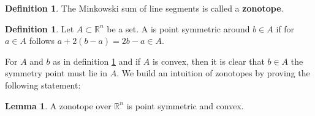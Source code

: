 \documentclass{article}
\theoremstyle{definition}
\newtheorem{lemma}[theorem]{Lemma}
\newtheorem{definition}[theorem]{Definition}
\begin{document}
\begin{definition}
The Minkowski sum of line segments is called a \textbf{zonotope}.
\end{definition}

\begin{definition}
\label{def:point_sym}
Let $A \subset \mathbb{R}^{n}$ be a set. A is point symmetric around $b \in A$ if for $a \in A$ follows $a + 2(b-a)=2b-a \in A$.
\end{definition}

For $A$ and $b$ as in definition \ref{def:point_sym} and if $A$ is convex, then it is clear that $b \in A$ the symmetry point must lie in $A$. We build an intuition of zonotopes by proving the following statement:

\begin{lemma}
\label{lem:zon_sym_conv}
A zonotope over $\mathbb{R}^{n}$ is point symmetric and convex.
\end{lemma}
\end{document}
